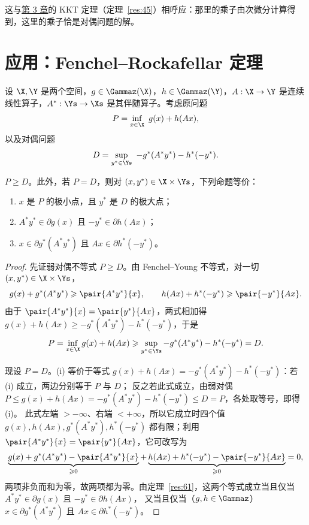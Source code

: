 这与\hyperref[ch:ch03]{第 3 章}的 KKT 定理（定理~\ref{res:45}）相呼应：那里的乘子由次微分计算得到，这里的乘子恰是对偶问题的解。

\section{应用：Fenchel--Rockafellar 定理}

设 $\X,\Y$ 是两个空间，$g\in\Gammaz(\X)$，$h\in\Gammaz(\Y)$，$A:\X\to\Y$ 是连续线性算子，$A^*:\Ys\to\Xs$ 是其伴随算子。考虑原问题
\[
  P=\inf_{x\in\X}\ g(x)+h(Ax),
\]
以及对偶问题
\[
  D=\sup_{y^*\in\Ys}\ -g^*(A^*y^*)-h^*(-y^*).
\]

\begin{proposition}[弱对偶]
\label{res:68}
$P\geqslant D$。此外，若 $P=D$，则对 $(x,y^*)\in\X\times\Ys$，下列命题等价：
\begin{enumerate}[label=(\roman*)]
  \item $x$ 是 $P$ 的极小点，且 $y^*$ 是 $D$ 的极大点；
  \item $A^*y^*\in\partial g(x)$ 且 $-y^*\in\partial h(Ax)$；
  \item $x\in\partial g^*(A^*y^*)$ 且 $Ax\in\partial h^*(-y^*)$。
\end{enumerate}
\end{proposition}

\begin{proof}
先证弱对偶不等式 $P\geqslant D$。由 Fenchel--Young 不等式，对一切 $(x,y^*)\in\X\times\Ys$，
\[
  g(x)+g^*(A^*y^*)\geqslant\pair{A^*y^*}{x},\qquad
  h(Ax)+h^*(-y^*)\geqslant\pair{-y^*}{Ax}.
\]
由于 $\pair{A^*y^*}{x}=\pair{y^*}{Ax}$，两式相加得 $g(x)+h(Ax)\geqslant-g^*(A^*y^*)-h^*(-y^*)$，于是
\[
  P=\inf_{x\in\X}g(x)+h(Ax)\geqslant\sup_{y^*\in\Ys}-g^*(A^*y^*)-h^*(-y^*)=D .
\]

现设 $P=D$。(i) 等价于等式 $g(x)+h(Ax)=-g^*(A^*y^*)-h^*(-y^*)$：若 (i) 成立，两边分别等于 $P$ 与 $D$；
反之若此式成立，由弱对偶 $P\leqslant g(x)+h(Ax)=-g^*(A^*y^*)-h^*(-y^*)\leqslant D=P$，各处取等号，即得 (i)。
此式左端 $>-\infty$、右端 $<+\infty$，所以它成立时四个值 $g(x),h(Ax),g^*(A^*y^*),h^*(-y^*)$ 都有限；利用 $\pair{A^*y^*}{x}=\pair{y^*}{Ax}$，它可改写为
\[
  \underbrace{g(x)+g^*(A^*y^*)-\pair{A^*y^*}{x}}_{\geqslant0}
  +\underbrace{h(Ax)+h^*(-y^*)-\pair{-y^*}{Ax}}_{\geqslant0}=0 ,
\]
两项非负而和为零，故两项都为零。由定理~\ref{res:61}，这两个等式成立当且仅当 $A^*y^*\in\partial g(x)$ 且 $-y^*\in\partial h(Ax)$，
又当且仅当（$g,h\in\Gammaz$）$x\in\partial g^*(A^*y^*)$ 且 $Ax\in\partial h^*(-y^*)$。
\end{proof}

